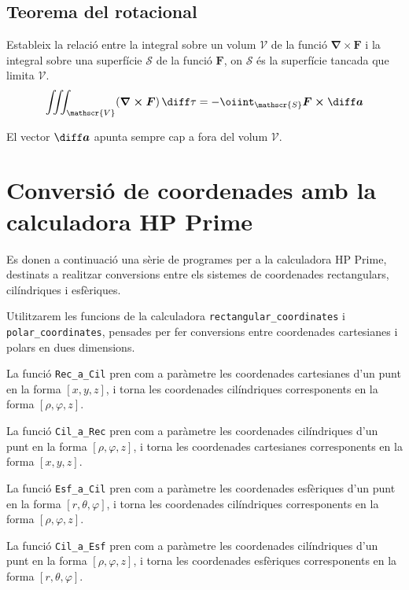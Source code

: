 \documentclass[catalan,a4paper,twoside,11pt]{article}
\begin{document}
\subsection{Teorema del rotacional}
Estableix la relació entre la integral sobre un volum $\mathscr{V}$ de la funció $\boldsymbol{\nabla\times F}$ i la integral sobre una superfície $\mathscr{S}$ de la funció $\boldsymbol{F}$, on $\mathscr{S}$ és la superfície tancada que limita $\mathscr{V}$.
\begin{equation}
    \iiint_\mathscr{V}(\boldsymbol{\nabla\times F})\,\diff \tau=-\oiint_\mathscr{S}
    \boldsymbol{F\times\diff a}
\end{equation}

El vector $\boldsymbol{\diff a}$ apunta sempre cap a fora del volum $\mathscr{V}$.

\section{Conversió de coordenades amb la calculadora \textsf{HP Prime}}

Es donen a continuació una sèrie de programes per a la calculadora \textsf{HP Prime}, destinats a realitzar conversions entre els  sistemes de coordenades rectangulars, cilíndriques i esfèriques.

Utilitzarem les funcions de la calculadora \texttt{rectangular\_coordinates} i \texttt{polar\_coordinates}, pensades per fer conversions entre coordenades cartesianes i polars en dues dimensions.

La funció \texttt{Rec\_a\_Cil} pren com a paràmetre les coordenades cartesianes d'un punt en la forma $[x,y,z]$, i torna les coordenades cilíndriques corresponents en la forma $[\rho,\varphi,z]$.



La funció \texttt{Cil\_a\_Rec} pren com a paràmetre les coordenades cilíndriques d'un punt en la forma $[\rho,\varphi,z]$, i torna les coordenades cartesianes corresponents en la forma  $[x,y,z]$.


La funció \texttt{Esf\_a\_Cil} pren com a paràmetre les coordenades esfèriques d'un punt en la forma $[r, \theta,\varphi]$, i torna les coordenades cilíndriques corresponents en la forma  $[\rho,\varphi,z]$.


La funció \texttt{Cil\_a\_Esf} pren com a paràmetre les coordenades cilíndriques  d'un punt en la forma $[\rho,\varphi,z]$, i torna les coordenades esfèriques corresponents en la forma $[r,\theta,\varphi]$.

\end{document}

